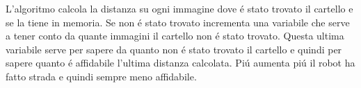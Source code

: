 		L'algoritmo calcola la distanza su ogni immagine dove \'e stato trovato il cartello e se la tiene in memoria. Se non \'e stato trovato incrementa una variabile che serve a tener conto da quante immagini il cartello non \'e stato trovato. Questa ultima variabile serve per sapere da quanto non \'e stato trovato il cartello e quindi per sapere quanto \'e affidabile l'ultima distanza calcolata. Pi\'u aumenta pi\'u il robot ha fatto strada e quindi sempre meno affidabile.

